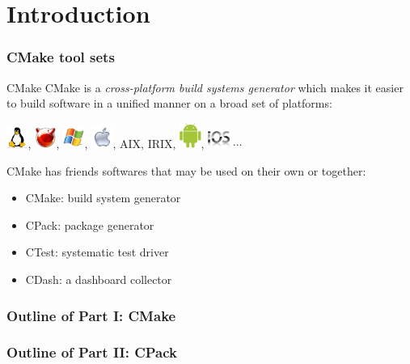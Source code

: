 \documentclass[compress,slidestop,table,usepdftitle=false
              ]
               {beamer}
\begin{document}
\section{Introduction}
\begin{frame}[fragile]
\frametitle{CMake tool sets}

\begin{block}{CMake}
CMake is a \emph{cross-platform build systems generator} which makes it easier
to build software in a unified manner on a broad set of platforms:

\includegraphics[width=0.7cm]{TuxLogo_48},
\includegraphics[width=0.7cm]{FreeBSDLogo_48},
\includegraphics[width=0.7cm]{MSWindowsLogo_48},
\includegraphics[width=0.7cm]{AppleLogo_48},
AIX, IRIX,
\includegraphics[width=0.7cm]{AndroidLogo},
\includegraphics[width=0.7cm]{AppleIOSLogo_48}
$\cdots$
\end{block}
CMake has friends softwares that may be used on their own or together:
\begin{itemize}
\item CMake: build system generator
\item CPack: package generator
\item CTest: systematic test driver
\item CDash: a dashboard collector
\end{itemize}
\end{frame}

\begin{frame}
\frametitle{Outline of Part I: CMake}
\tableofcontents[part=1]
\end{frame}

\begin{frame}
\frametitle{Outline of Part II: CPack}
\tableofcontents[part=2]
\end{frame}
\end{document}
